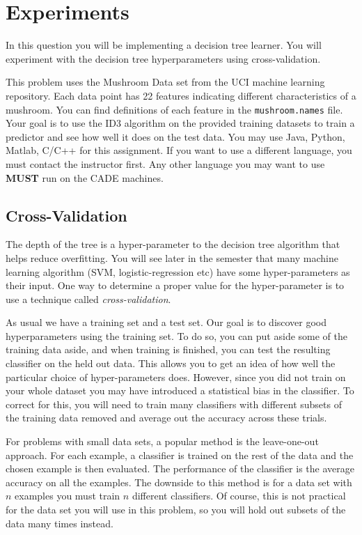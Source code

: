 \section{Experiments}
\label{sec:q1}

In this question you will be implementing a decision tree learner. You will experiment with the decision tree hyperparameters using cross-validation.

This problem uses the Mushroom Data set from the UCI machine learning repository. Each data point has 22 features indicating different characteristics of a mushroom. You can find definitions of each feature in the \texttt{mushroom.names} file. Your goal is to use the ID3 algorithm on the provided training datasets to train a predictor and see how well it does on the test data. You may use Java, Python, Matlab, C/C++ for this assignment. If you want to use a different language, you must contact the instructor first. Any other language you may want to use \textbf{MUST} run on the CADE machines.


\subsection*{Cross-Validation}

The depth of the tree is a hyper-parameter to the decision tree
algorithm that helps reduce overfitting. You will see later in the
semester that many machine learning algorithm (SVM,
logistic-regression etc) have some hyper-parameters as their input.
One way to determine a proper value for the hyper-parameter is to use
a technique called {\em cross-validation}.

As usual we have a training set and a test set. Our goal is to
discover good hyperparameters using the training set. To do so, you
can put aside some of the training data aside, and when training is
finished, you can test the resulting classifier on the held out data.
This allows you to get an idea of how well the particular choice of
hyper-parameters does. However, since you did not train on your whole
dataset you may have introduced a statistical bias in the classifier.
To correct for this, you will need to train many classifiers with
different subsets of the training data removed and average out the
accuracy across these trials.

For problems with small data sets, a popular method is the
leave-one-out approach. For each example, a classifier is trained on
the rest of the data and the chosen example is then evaluated. The
performance of the classifier is the average accuracy on all the
examples. The downside to this method is for a data set with $n$
examples you must train $n$ different classifiers. Of course, this is
not practical for the data set you will use in this problem, so you
will hold out subsets of the data many times instead.


